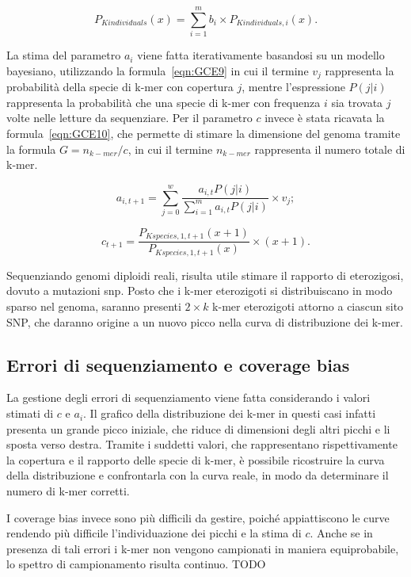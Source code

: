 \documentclass[crop=false, class=book]{standalone}
\begin{document}
	\begin{equation}
		\label{eqn:GCE8}
		P_{Kindividuals}(x) = \sum_{i=1}^{m} b_i \times P_{Kindividuals, i}(x).
	\end{equation}
	
	La stima del parametro $a_i$ viene fatta iterativamente basandosi su un modello bayesiano, utilizzando la formula~\vref{eqn:GCE9} in cui il termine $v_j$ rappresenta la probabilità della specie di k-mer con copertura $j$, mentre l'espressione $P(j|i)$ rappresenta la probabilità che una specie di k-mer con frequenza $i$ sia trovata $j$ volte nelle letture da sequenziare. Per il parametro $c$ invece è stata ricavata la formula~\vref{eqn:GCE10}, che permette di stimare la dimensione del genoma tramite la formula $G = n_{k-mer}/c$, in cui il termine $ n_{k-mer}$ rappresenta il numero totale di k-mer.
	
	\begin{equation}
		\label{eqn:GCE9}
		a_{i,t+1} = \sum_{j=0}^{w} \frac{a_{i,t} P(j|i)}{\sum_{i=1}^{m} a_{i,t} P(j|i)} \times v_j;
	\end{equation}

	\begin{equation}
		\label{eqn:GCE10}
		c_{t+1} = \frac{P_{Kspecies, 1, t+1}(x+1)}{P_{Kspecies, 1, t+1}(x)} \times (x+1).
	\end{equation}
	
	Sequenziando genomi diploidi reali, risulta utile stimare il rapporto di eterozigosi, dovuto a mutazioni \gls{snp}. Posto che i k-mer eterozigoti si distribuiscano in modo sparso nel genoma, saranno presenti $2\times k$ k-mer eterozigoti attorno a ciascun sito SNP, che daranno origine a un nuovo picco nella curva di distribuzione dei k-mer. 
	
	\subsection{Errori di sequenziamento e coverage bias}
	La gestione degli errori di sequenziamento viene fatta considerando i valori stimati di $c$ e $a_i$. Il grafico della distribuzione dei k-mer in questi casi infatti presenta un grande picco iniziale, che riduce di dimensioni degli altri picchi e li sposta verso destra. Tramite i suddetti valori, che rappresentano rispettivamente la copertura e il rapporto delle specie di k-mer, è possibile ricostruire la curva della distribuzione e confrontarla con la curva reale, in modo da determinare il numero di k-mer corretti.
	
	I coverage bias invece sono più difficili da gestire, poiché appiattiscono le curve rendendo più difficile l'individuazione dei picchi e la stima di $c$. Anche se in presenza di tali errori i k-mer non vengono campionati in maniera equiprobabile, lo spettro di campionamento risulta continuo.  TODO
	
	
\end{document}
